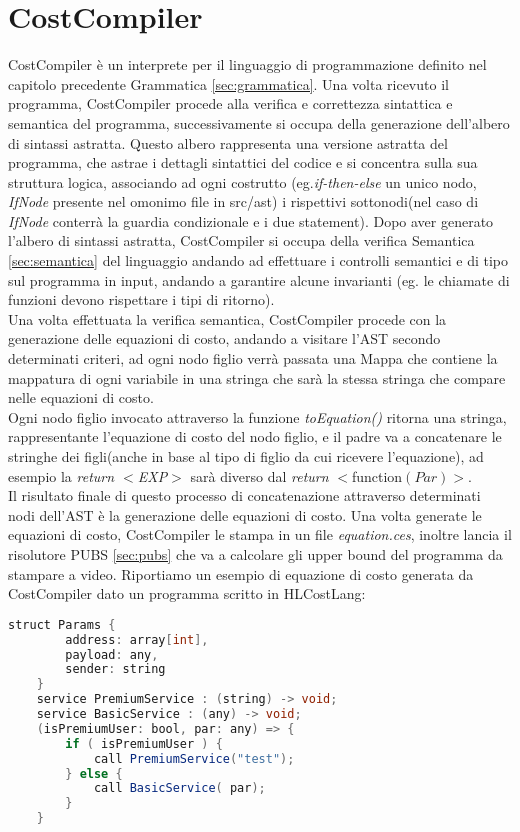 \documentclass[../../main.tex]{subfiles}
\begin{document}
\chapter{CostCompiler}
CostCompiler è un interprete per il linguaggio di programmazione definito nel capitolo precedente Grammatica \ref{sec:grammatica}. Una volta ricevuto il programma, CostCompiler procede alla verifica e correttezza sintattica e semantica del programma, successivamente si occupa della generazione dell'albero di sintassi astratta. 
Questo albero rappresenta una versione astratta del programma, che astrae i dettagli sintattici del codice e si concentra sulla sua struttura logica, associando ad ogni costrutto (eg.\textit{if-then-else} un unico nodo, \textit{IfNode} presente nel omonimo file in src/ast) i rispettivi sottonodi(nel caso di \textit{IfNode} conterrà la guardia condizionale e i due statement).
Dopo aver generato l'albero di sintassi astratta, CostCompiler si occupa della verifica Semantica \ref{sec:semantica} del linguaggio andando ad effettuare i controlli semantici e di tipo sul programma in input, andando a garantire alcune invarianti (eg. le chiamate di funzioni devono rispettare i tipi di ritorno).\\
Una volta effettuata la verifica semantica, CostCompiler procede con la generazione delle equazioni di costo, andando a visitare l'AST secondo determinati criteri, ad ogni nodo figlio verrà passata una Mappa che contiene la mappatura di ogni variabile in una stringa che sarà la stessa stringa che compare nelle equazioni di costo.\\
Ogni nodo figlio invocato attraverso la funzione \textit{toEquation()} ritorna una stringa, rappresentante l'equazione di costo del nodo figlio, e il padre va a concatenare le stringhe dei figli(anche in base al tipo di figlio da cui ricevere l'equazione), ad esempio la \textit{return $<$EXP$>$ } sarà diverso dal \textit{return }$<$function$(Par)>$.\\
Il risultato finale di questo processo di concatenazione attraverso determinati nodi dell'AST è la generazione delle equazioni di costo. 
Una volta generate le equazioni di costo, CostCompiler le stampa in un file \textit{equation.ces}, inoltre lancia il risolutore PUBS \ref{sec:pubs} che va a calcolare gli upper bound del programma da stampare a video.
Riportiamo un esempio di equazione di costo generata da CostCompiler dato un programma scritto in HLCostLang:
    \begin{lstlisting}[language=Java, caption={Listing8}]
    struct Params {
        address: array[int],
        payload: any,
        sender: string
    }
    service PremiumService : (string) -> void;
    service BasicService : (any) -> void;
    (isPremiumUser: bool, par: any) => {
        if ( isPremiumUser ) {
            call PremiumService("test");
        } else {
            call BasicService( par);
        }
    }
\end{lstlisting}
\end{document}
